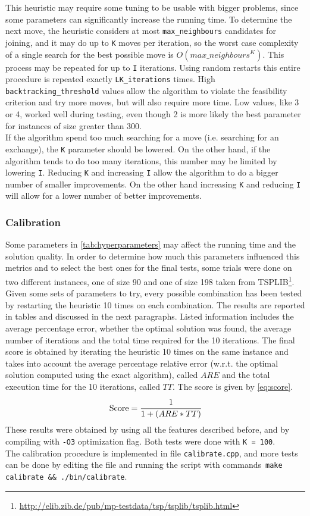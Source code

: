 This heuristic may require some tuning to be usable with bigger problems, since some parameters can significantly increase the running time. To determine the next move, the heuristic considers at most \texttt{max\_neighbours} candidates for joining, and it may do up to \texttt{K} moves per iteration, so the worst case complexity of a single search for the best possible move is $O(max\_neighbours^K)$. This process may be repeated for up to \texttt{I} iterations. Using random restarts this entire procedure is repeated exactly \texttt{LK\_iterations} times. High \texttt{back\-track\-ing\_threshold} values allow the algorithm to violate the feasibility criterion and try more moves, but will also require more time. Low values, like 3 or 4, worked well during testing, even though 2 is more likely the best parameter for instances of size greater than 300.\\
If the algorithm spend too much searching for a move (i.e. searching for an exchange), the \texttt{K} parameter should be lowered. On the other hand, if the algorithm tends to do too many iterations, this number may be limited by lowering \texttt{I}. Reducing \texttt{K} and increasing \texttt{I} allow the algorithm to do a bigger number of smaller improvements. On the other hand increasing \texttt{K} and reducing \texttt{I} will allow for a lower number of better improvements.

\subsubsection{Calibration}
Some parameters in \cref{tab:hyperparameters} may affect the running time and the solution quality. In order to determine how much this parameters influenced this metrics and to select the best ones for the final tests, some trials were done on two different instances, one of size 90 and one of size 198 taken from TSPLIB\footnote{\url{http://elib.zib.de/pub/mp-testdata/tsp/tsplib/tsplib.html}}. Given some sets of parameters to try, every possible combination has been tested by restarting the heuristic 10 times on each combination. The results are reported in tables and discussed in the next paragraphs. Listed information includes the average percentage error, whether the optimal solution was found, the average number of iterations and the total time required for the 10 iterations. The final score is obtained by iterating the heuristic 10 times on the same instance and takes into account the average percentage relative error (w.r.t. the optimal solution computed using the exact algorithm), called $ARE$ and the total execution time for the 10 iterations, called $TT$. The score is given by \cref{eq:score}.
\begin{equation}
	\text{Score} = \cfrac{1}{1 + (ARE * TT)}
	\label{eq:score}
\end{equation}
These results were obtained by using all the features described before, and by compiling with \texttt{-O3} optimization flag. Both tests were done with \texttt{K = 100}.\\
The calibration procedure is implemented in file \texttt{calibrate.cpp}, and more tests can be done by editing the file and running the script with commands~\texttt{make calibrate \&\& ./bin/calibrate}.

